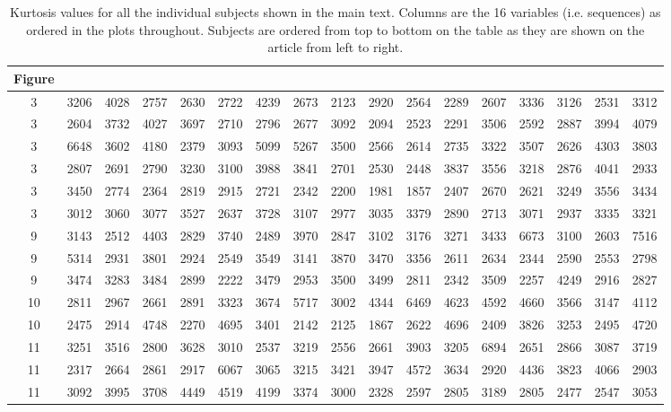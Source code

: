 \documentclass[12pt,letterpaper]{article}
\begin{document}
\clearpage

\begin{table}[t]
\centering
\begin{adjustbox}{width=1\textwidth}
\begin{tabular}{c|cccccccccccccccc}
Figure & \\
\hline
3 & 3206 & 4028 & 2757 & 2630 & 2722 & 4239 & 2673 & 2123 & 2920 & 2564 & 2289 & 2607 & 3336 & 3126 & 2531 & 3312 \\ 
3 & 2604 & 3732 & 4027 & 3697 & 2710 & 2796 & 2677 & 3092 & 2094 & 2523 & 2291 & 3506 & 2592 & 2887 & 3994 & 4079 \\ 
3 & 6648 & 3602 & 4180 & 2379 & 3093 & 5099 & 5267 & 3500 & 2566 & 2614 & 2735 & 3322 & 3507 & 2626 & 4303 & 3803 \\ 
3 & 2807 & 2691 & 2790 & 3230 & 3100 & 3988 & 3841 & 2701 & 2530 & 2448 & 3837 & 3556 & 3218 & 2876 & 4041 & 2933 \\ 
3 & 3450 & 2774 & 2364 & 2819 & 2915 & 2721 & 2342 & 2200 & 1981 & 1857 & 2407 & 2670 & 2621 & 3249 & 3556 & 3434 \\ 
3 & 3012 & 3060 & 3077 & 3527 & 2637 & 3728 & 3107 & 2977 & 3035 & 3379 & 2890 & 2713 & 3071 & 2937 & 3335 & 3321 \\ \hline
9 & 3143 & 2512 & 4403 & 2829 & 3740 & 2489 & 3970 & 2847 & 3102 & 3176 & 3271 & 3433 & 6673 & 3100 & 2603 & 7516 \\ 
9 & 5314 & 2931 & 3801 & 2924 & 2549 & 3549 & 3141 & 3870 & 3470 & 3356 & 2611 & 2634 & 2344 & 2590 & 2553 & 2798 \\ 
9 & 3474 & 3283 & 3484 & 2899 & 2222 & 3479 & 2953 & 3500 & 3499 & 2811 & 2342 & 3509 & 2257 & 4249 & 2916 & 2827 \\ \hline
10 & 2811 & 2967 & 2661 & 2891 & 3323 & 3674 & 5717 & 3002 & 4344 & 6469 & 4623 & 4592 & 4660 & 3566 & 3147 & 4112 \\ 
10 & 2475 & 2914 & 4748 & 2270 & 4695 & 3401 & 2142 & 2125 & 1867 & 2622 & 4696 & 2409 & 3826 & 3253 & 2495 & 4720 \\ \hline
11 & 3251 & 3516 & 2800 & 3628 & 3010 & 2537 & 3219 & 2556 & 2661 & 3903 & 3205 & 6894 & 2651 & 2866 & 3087 & 3719 \\ 
11 & 2317 & 2664 & 2861 & 2917 & 6067 & 3065 & 3215 & 3421 & 3947 & 4572 & 3634 & 2920 & 4436 & 3823 & 4066 & 2903 \\ 
11 & 3092 & 3995 & 3708 & 4449 & 4519 & 4199 & 3374 & 3000 & 2328 & 2597 & 2805 & 3189 & 2805 & 2477 & 2547 & 3053 \\ \hline
\end{tabular}
\end{adjustbox}
\caption[]{Kurtosis values for all the individual subjects shown in the main text. Columns are the 16 variables (i.e. sequences) as ordered in the plots throughout. Subjects are ordered from top to bottom on the table as they are shown on the article from left to right.}
\end{table}
\end{document}
